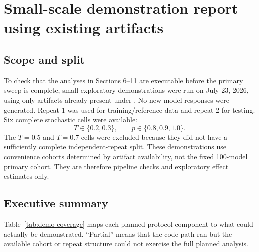 \documentclass[11pt,a4paper]{article}
\begin{document}
\clearpage
\section{Small-scale demonstration report using existing artifacts}
\label{sec:small-demo}

\subsection{Scope and split}

To check that the analyses in Sections 6--11 are executable before the primary
sweep is complete, small exploratory demonstrations were run on July 23, 2026,
using only artifacts already present under . No new model
responses were generated. Repeat 1 was used for training/reference data and
repeat 2 for testing. Six complete stochastic cells were available:
\[
  T\in\{0.2,0.3\},\qquad p\in\{0.8,0.9,1.0\}.
\]
The $T=0.5$ and $T=0.7$ cells were excluded because they did not have a
sufficiently complete independent-repeat split. These demonstrations use
convenience cohorts determined by artifact availability, not the fixed
100-model primary cohort. They are therefore pipeline checks and exploratory
effect estimates only.

\subsection{Executive summary}

\noindent{}

\medskip
Table~\ref{tab:demo-coverage} maps each planned protocol component to what
could actually be demonstrated. ``Partial'' means that the code path ran but
the available cohort or repeat structure could not exercise the full planned
analysis.
\end{document}

